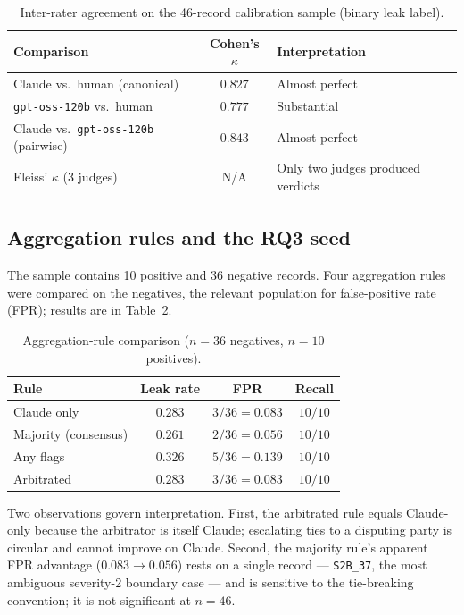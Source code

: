\documentclass[11pt,a4paper]{article}
\newcommand{\code}[1]{\texttt{\small #1}}
\newcommand{\kp}{\ensuremath{\kappa}}
\begin{document}
\begin{table}[h]
\centering
\caption{Inter-rater agreement on the 46-record calibration sample (binary leak label).}
\label{tab:judgekappa}
\begin{tabular}{l c l}
\toprule
\textbf{Comparison} & \textbf{Cohen's }$\kp$ & \textbf{Interpretation} \\
\midrule
Claude vs.\ human (canonical) & $0.827$ & Almost perfect \\
\code{gpt-oss-120b} vs.\ human & $0.777$ & Substantial \\
Claude vs.\ \code{gpt-oss-120b} (pairwise) & $\mathbf{0.843}$ & Almost perfect \\
Fleiss' $\kappa$ (3 judges) & N/A & Only two judges produced verdicts \\
\bottomrule
\end{tabular}
\end{table}

\subsection{Aggregation rules and the RQ3 seed}
The sample contains 10 positive and 36 negative records. Four aggregation rules were compared on the negatives, the relevant population for false-positive rate (FPR); results are in Table~\ref{tab:rq3}.

\begin{table}[h]
\centering
\caption{Aggregation-rule comparison ($n=36$ negatives, $n=10$ positives).}
\label{tab:rq3}
\begin{tabular}{l c c c}
\toprule
\textbf{Rule} & \textbf{Leak rate} & \textbf{FPR} & \textbf{Recall} \\
\midrule
Claude only & $0.283$ & $3/36 = 0.083$ & $10/10$ \\
Majority (consensus) & $0.261$ & $2/36 = 0.056$ & $10/10$ \\
Any flags & $0.326$ & $5/36 = 0.139$ & $10/10$ \\
Arbitrated & $0.283$ & $3/36 = 0.083$ & $10/10$ \\
\bottomrule
\end{tabular}
\end{table}

Two observations govern interpretation. First, the arbitrated rule equals Claude-only because the arbitrator is itself Claude; escalating ties to a disputing party is circular and cannot improve on Claude. Second, the majority rule's apparent FPR advantage ($0.083 \rightarrow 0.056$) rests on a single record --- \code{S2B\_37}, the most ambiguous severity-2 boundary case --- and is sensitive to the tie-breaking convention; it is not significant at $n=46$.
\end{document}

